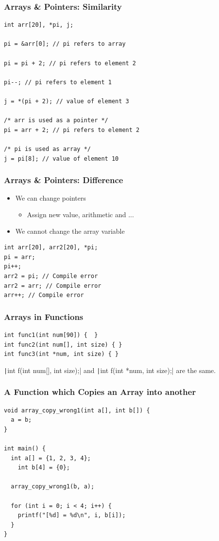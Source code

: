 \documentclass{../c-lecture}
\begin{document}
\begin{frame}[fragile]
  \frametitle{Arrays \& Pointers: Similarity}
  \begin{verbatim}
int arr[20], *pi, j;

pi = &arr[0]; // pi refers to array

pi = pi + 2; // pi refers to element 2

pi--; // pi refers to element 1

j = *(pi + 2); // value of element 3

/* arr is used as a pointer */
pi = arr + 2; // pi refers to element 2

/* pi is used as array */
j = pi[8]; // value of element 10
  \end{verbatim}
\end{frame}

\begin{frame}[fragile]
  \frametitle{Arrays \& Pointers: Difference}
  \begin{itemize}
    \item We can change pointers
    \begin{itemize}
      \item Assign new value, arithmetic and ...
    \end{itemize}
    \item We cannot change the array variable
  \end{itemize}
  \begin{verbatim}
int arr[20], arr2[20], *pi;
pi = arr;
pi++;
arr2 = pi; // Compile error
arr2 = arr; // Compile error
arr++; // Compile error
  \end{verbatim}
\end{frame}

\begin{frame}[fragile]
  \frametitle{Arrays in Functions}
  \begin{verbatim}
int func1(int num[90]) {  }
int func2(int num[], int size) { }
int func3(int *num, int size) { }
  \end{verbatim}
  \begin{block}{}
    \texttt|int f(int num[], int size);|
    and
    \texttt|int f(int *num, int size);|
    are the same.
  \end{block}
\end{frame}

\begin{frame}[fragile]
  \frametitle{A Function which Copies an Array into another}
  \begin{verbatim}
void array_copy_wrong1(int a[], int b[]) {
  a = b;
}

int main() {
  int a[] = {1, 2, 3, 4};
	int b[4] = {0};

  array_copy_wrong1(b, a);

  for (int i = 0; i < 4; i++) {
    printf("[%d] = %d\n", i, b[i]);
  }
}
  \end{verbatim}
\end{frame}
\end{document}
